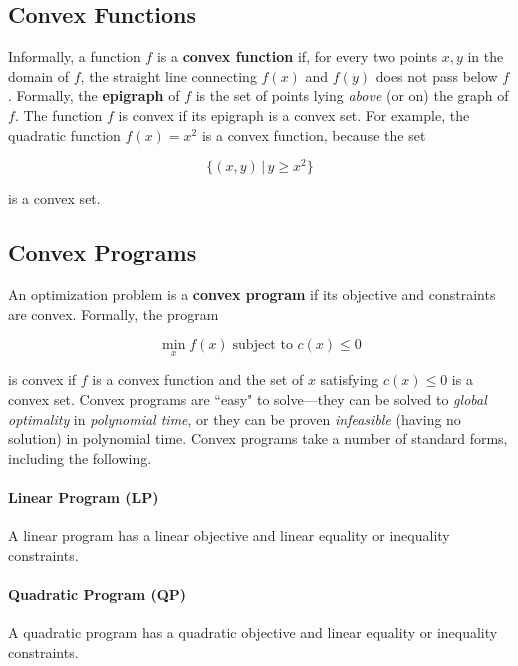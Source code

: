 \documentclass[12pt]{article}
\begin{document}
	\subsection{Convex Functions}
	
	Informally, a function \( f \) is a \textbf{convex function} if, for every two points \( x, y \) in the domain of \( f \), the straight line connecting \( f(x) \) and \( f(y) \) does not pass below \( f \).  Formally, the \textbf{epigraph} of \( f \) is the set of points lying \textit{above} (or on) the graph of \( f \).  The function \( f \) is convex if its epigraph is a convex set.  For example, the quadratic function \( f(x) = x^2 \) is a convex function, because the set
	
	\begin{equation*}
		\{ (x, y) \, | \, y \ge x^2 \}
	\end{equation*}
	
	is a convex set.
	
	\subsection{Convex Programs}
	
	An optimization problem is a \textbf{convex program} if its objective and constraints are convex.  Formally, the program
	
	\begin{equation}
		\min_x f(x) \; \text{subject to } c(x) \le 0
	\end{equation}
	
	is convex if \( f \) is a convex function and the set of \( x \) satisfying \( c(x) \le 0 \) is a convex set.  Convex programs are ``easy" to solve---they can be solved to \textit{global optimality} in \textit{polynomial time}, or they can be proven \textit{infeasible} (having no solution) in polynomial time.  Convex programs take a number of standard forms, including the following.
	
	\paragraph{Linear Program (LP)} A linear program has a linear objective and linear equality or inequality constraints.
	
	\paragraph{Quadratic Program (QP)} A quadratic program has a quadratic objective and linear equality or inequality constraints.
	
\end{document}
